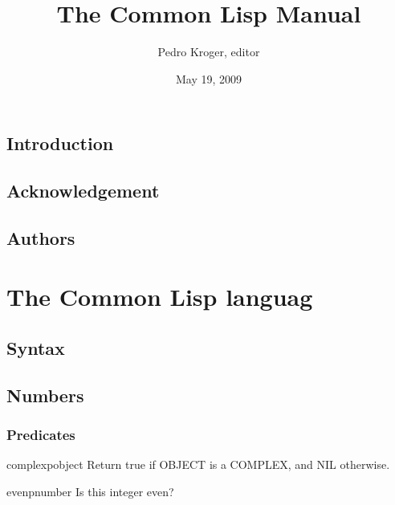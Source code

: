 \documentclass[10pt,english]{book}
\title{The Common Lisp Manual}
\author{Pedro Kroger, editor}
\date{May 19, 2009}
\begin{document}
\frontmatter

\maketitle
\tableofcontents

\mainmatter

\chapter*{Introduction}
\label{cha:introduction}



\chapter*{Acknowledgement}
\label{cha:acknowledgement}



\chapter*{Authors}
\label{cha:authors}



\part{The Common Lisp languag}
\label{part:common-lisp-language}

\chapter{Syntax}
\label{cha:syntax}


\chapter{Numbers}

\section{Predicates}
\label{sec:number-predicates}

\begin{function}{complexp}{object}
  Return true if OBJECT is a COMPLEX, and NIL otherwise.
\end{function}

\begin{function}{evenp}{number}
  Is this integer even?
\end{function}
\end{document}
